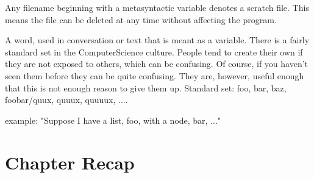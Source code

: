 \documentclass[thesis-solanki.tex]{subfiles}
\begin{document}
Any filename beginning with a metasyntactic variable denotes a scratch file. This means the file can be deleted at any time without affecting the program.



\cite{webste:metasyntacticvariablesc2wiki}

A word, used in conversation or text that is meant as a variable. There is a fairly standard set in the ComputerScience culture. People tend to create their own if they are not exposed to others, which can be confusing. Of course, if you haven't seen them before they can be quite confusing. They are, however, useful enough that this is not enough reason to give them up.
Standard set: foo, bar, baz, foobar/quux, quuux, quuuux, ....

example: "Suppose I have a list, foo, with a node, bar, ..."


\section{Chapter Recap}
\end{document}
